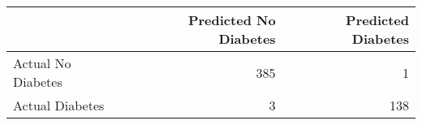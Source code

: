 \begin{tabular}{lrr}
\toprule
 & Predicted No Diabetes & Predicted Diabetes \\
\midrule
Actual No Diabetes & 385 & 1 \\
Actual Diabetes & 3 & 138 \\
\bottomrule
\end{tabular}
